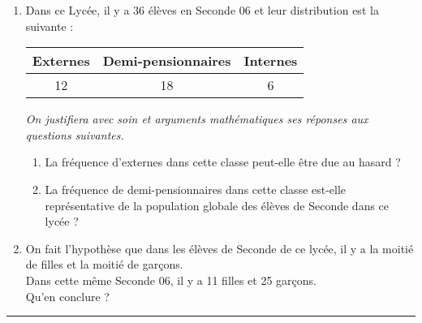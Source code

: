 \begin{exo}[12 points]
\begin{enumerate}
 \item Dans ce Lyc\'ee, il y a 36 \'el\`eves en Seconde 06 et leur distribution est la suivante :
\begin{center}
 \begin{tabular}{c|c|c}
    Externes & Demi-pensionnaires & Internes \\ \hline
    12 & 18 & 6
 \end{tabular}
\end{center}
\emph{On justifiera avec soin et arguments math\'ematiques ses r\'eponses aux questions suivantes.}
\begin{enumerate}
 \item La fr\'equence d'externes dans cette classe peut-elle \^etre due au hasard ?
 \item La fr\'equence de demi-pensionnaires dans cette classe est-elle repr\'esentative de la population globale des \'el\`eves de Seconde dans ce lyc\'ee ?
\end{enumerate}
 \item On fait l'hypoth\`ese que dans les \'el\`eves de Seconde de ce lyc\'ee, il y a la moiti\'e de filles et la moiti\'e de gar\c{c}ons.\\
 Dans cette m\^eme Seconde 06, il y a 11 filles et 25 gar\c{c}ons. \\
 Qu'en conclure ?
\end{enumerate}

\end{exo}

\medskip

\hrule




\setcounter{chapter}{\thechaptertemp} %



